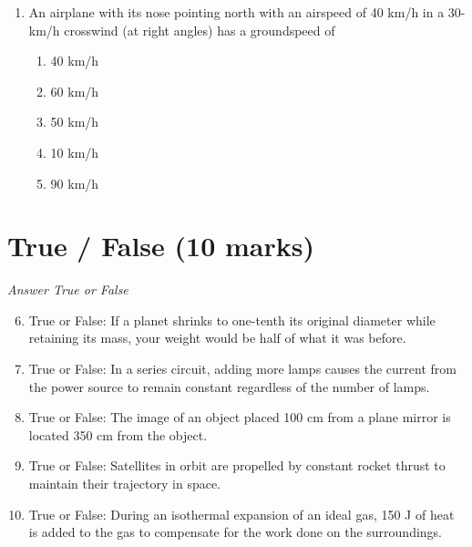 \documentclass[12pt]{article}
\begin{document}
\begin{enumerate}[label=\arabic*.]
\begin{enumerate}[label=(\alph*)]
    \item $97 \mu \mathrm{C}$
    \item $37$$\mu \mathrm{C}$
    \item $77 \mu \mathrm{C}$
    \item $87 \mu \mathrm{C}$
    \item $17 \mu \mathrm{C}$
\end{enumerate}
\item An airplane with its nose pointing north with an airspeed of 40 km/h in a 30-km/h crosswind (at right angles) has a groundspeed of
\begin{enumerate}[label=(\alph*)]
    \item 40 km/h
    \item 60 km/h
    \item 50 km/h
    \item 10 km/h
    \item 90 km/h
\end{enumerate}
\end{enumerate}

\section*{True / False (10 marks)}
\textit{Answer True or False}
\begin{enumerate}[label=\arabic*.]
\setcounter{enumi}{5}
\item True or False: If a planet shrinks to one-tenth its original diameter while retaining its mass, your weight would be half of what it was before.
\item True or False: In a series circuit, adding more lamps causes the current from the power source to remain constant regardless of the number of lamps.
\item True or False: The image of an object placed 100 cm from a plane mirror is located 350 cm from the object.
\item True or False: Satellites in orbit are propelled by constant rocket thrust to maintain their trajectory in space.
\item True or False: During an isothermal expansion of an ideal gas, 150 J of heat is added to the gas to compensate for the work done on the surroundings.
\end{enumerate}
\end{document}
